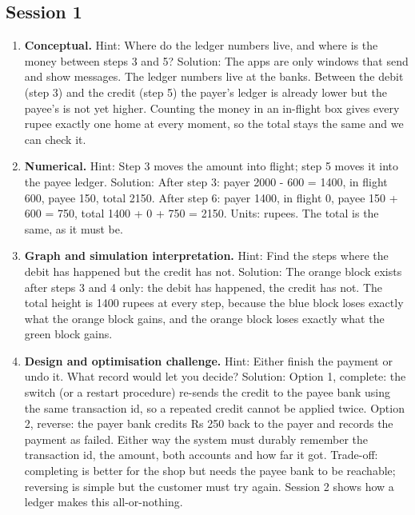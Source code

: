 \documentclass[11pt,a4paper]{article}
\begin{document}
\subsection*{Session 1}
\begin{enumerate}[nosep]
\item \textbf{Conceptual.} Hint: Where do the ledger numbers live, and where is the money between steps 3 and 5? Solution: The apps are only windows that send and show messages. The ledger numbers live at the banks. Between the debit (step 3) and the credit (step 5) the payer's ledger is already lower but the payee's is not yet higher. Counting the money in an in-flight box gives every rupee exactly one home at every moment, so the total stays the same and we can check it.
\item \textbf{Numerical.} Hint: Step 3 moves the amount into flight; step 5 moves it into the payee ledger. Solution: After step 3: payer 2000 - 600 = 1400, in flight 600, payee 150, total 2150. After step 6: payer 1400, in flight 0, payee 150 + 600 = 750, total 1400 + 0 + 750 = 2150. Units: rupees. The total is the same, as it must be.
\item \textbf{Graph and simulation interpretation.} Hint: Find the steps where the debit has happened but the credit has not. Solution: The orange block exists after steps 3 and 4 only: the debit has happened, the credit has not. The total height is 1400 rupees at every step, because the blue block loses exactly what the orange block gains, and the orange block loses exactly what the green block gains.
\item \textbf{Design and optimisation challenge.} Hint: Either finish the payment or undo it. What record would let you decide? Solution: Option 1, complete: the switch (or a restart procedure) re-sends the credit to the payee bank using the same transaction id, so a repeated credit cannot be applied twice. Option 2, reverse: the payer bank credits Rs 250 back to the payer and records the payment as failed. Either way the system must durably remember the transaction id, the amount, both accounts and how far it got. Trade-off: completing is better for the shop but needs the payee bank to be reachable; reversing is simple but the customer must try again. Session 2 shows how a ledger makes this all-or-nothing.
\end{enumerate}
\end{document}
